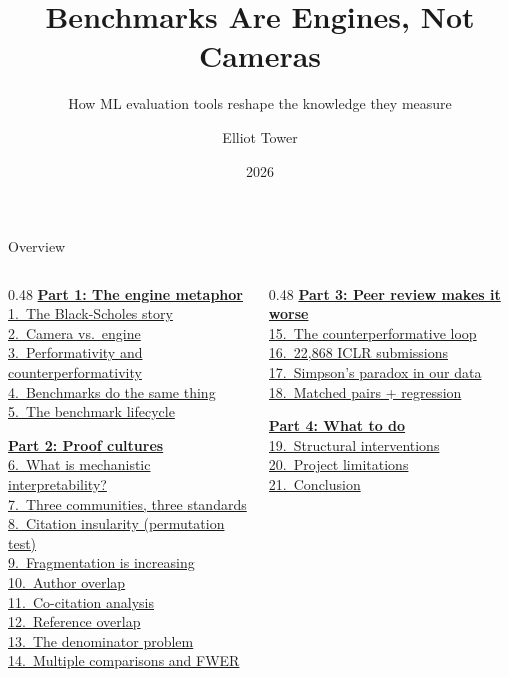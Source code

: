 \documentclass[aspectratio=169,11pt]{beamer}
\title{Benchmarks Are Engines, Not Cameras}
\subtitle{How ML evaluation tools reshape the knowledge they measure}
\author{Elliot Tower}
\date{2026}
\institute{}
\begin{document}
\maketitle

\begin{frame}{Overview}
\begin{columns}[T]
\begin{column}{0.48\textwidth}
\hyperlink{part1}{\textbf{Part 1: The engine metaphor}}\\[0.15em]
{\footnotesize%
\quad\hyperlink{blackscholes}{1.~The Black-Scholes story}\\%
\quad\hyperlink{camera}{2.~Camera vs.\ engine}\\%
\quad\hyperlink{counterperf}{3.~Performativity and counterperformativity}\\%
\quad\hyperlink{benchclaim}{4.~Benchmarks do the same thing}\\%
\quad\hyperlink{lifecycle}{5.~The benchmark lifecycle}%
}\vspace{0.6em}

\hyperlink{part2}{\textbf{Part 2: Proof cultures}}\\[0.15em]
{\footnotesize%
\quad\hyperlink{whatmi}{6.~What is mechanistic interpretability?}\\%
\quad\hyperlink{threecommunities}{7.~Three communities, three standards}\\%
\quad\hyperlink{citationtest}{8.~Citation insularity (permutation test)}\\%
\quad\hyperlink{temporal}{9.~Fragmentation is increasing}\\%
\quad\hyperlink{authoroverlap}{10.~Author overlap}\\%
\quad\hyperlink{cocitation}{11.~Co-citation analysis}\\%
\quad\hyperlink{refoverlap}{12.~Reference overlap}\\%
\quad\hyperlink{denominator}{13.~The denominator problem}\\%
\quad\hyperlink{multicomp}{14.~Multiple comparisons and FWER}%
}
\end{column}
\begin{column}{0.48\textwidth}
\hyperlink{part3}{\textbf{Part 3: Peer review makes it worse}}\\[0.15em]
{\footnotesize%
\quad\hyperlink{paradox}{15.~The counterperformative loop}\\%
\quad\hyperlink{iclrdata}{16.~22,868 ICLR submissions}\\%
\quad\hyperlink{simpson}{17.~Simpson's paradox in our data}\\%
\quad\hyperlink{matched}{18.~Matched pairs + regression}%
}

\vspace{1.2em}
\hyperlink{part4}{\textbf{Part 4: What to do}}\\[0.15em]
{\footnotesize
\quad\hyperlink{interventions}{19.~Structural interventions}\\
\quad\hyperlink{limitations}{20.~Project limitations}\\
\quad\hyperlink{conclusion}{21.~Conclusion}
}
\end{column}
\end{columns}
\end{frame}
\end{document}

